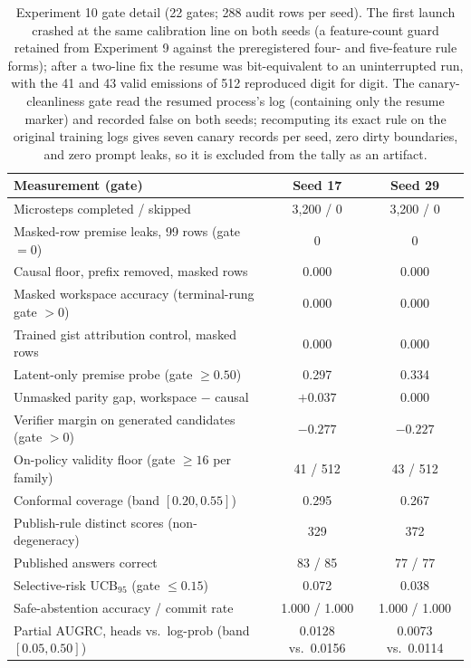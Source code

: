 \documentclass[10pt,a4paper]{article}
\newcommand{\fail}[1]{\textcolor{failred}{#1}}
\begin{document}
\begin{table}[htbp]
\caption{Experiment 10 gate detail (22 gates; 288 audit rows per seed). The first launch crashed at the same calibration line on both seeds (a feature-count guard retained from Experiment 9 against the preregistered four- and five-feature rule forms); after a two-line fix the resume was bit-equivalent to an uninterrupted run, with the 41 and 43 valid emissions of 512 reproduced digit for digit. The canary-cleanliness gate read the resumed process's log (containing only the resume marker) and recorded false on both seeds; recomputing its exact rule on the original training logs gives seven canary records per seed, zero dirty boundaries, and zero prompt leaks, so it is excluded from the tally as an artifact.}
\label{tab:gates-exp10}
\centering\footnotesize
\begin{tabularx}{\textwidth}{@{}Xcc@{}}
\toprule
Measurement (gate) & Seed 17 & Seed 29 \\
\midrule
Microsteps completed / skipped & 3,200 / 0 & 3,200 / 0 \\
Masked-row premise leaks, 99 rows (gate $=0$) & 0 & 0 \\
Causal floor, prefix removed, masked rows & 0.000 & 0.000 \\
Masked workspace accuracy (terminal-rung gate $>0$) & \fail{0.000} & \fail{0.000} \\
Trained gist attribution control, masked rows & 0.000 & 0.000 \\
Latent-only premise probe (gate $\geq 0.50$) & \fail{0.297} & \fail{0.334} \\
Unmasked parity gap, workspace $-$ causal & $+0.037$ & 0.000 \\
Verifier margin on generated candidates (gate $>0$) & \fail{$-0.277$} & \fail{$-0.227$} \\
On-policy validity floor (gate $\geq 16$ per family) & \fail{41 / 512} & \fail{43 / 512} \\
Conformal coverage (band $[0.20, 0.55]$) & 0.295 & 0.267 \\
Publish-rule distinct scores (non-degeneracy) & 329 & 372 \\
Published answers correct & 83 / 85 & 77 / 77 \\
Selective-risk UCB$_{95}$ (gate $\leq 0.15$) & 0.072 & 0.038 \\
Safe-abstention accuracy / commit rate & 1.000 / 1.000 & 1.000 / 1.000 \\
Partial AUGRC, heads vs.\ log-prob (band $[0.05, 0.50]$) & 0.0128 vs.\ 0.0156 & 0.0073 vs.\ 0.0114 \\

\end{tabularx}
\end{table}
\end{document}
